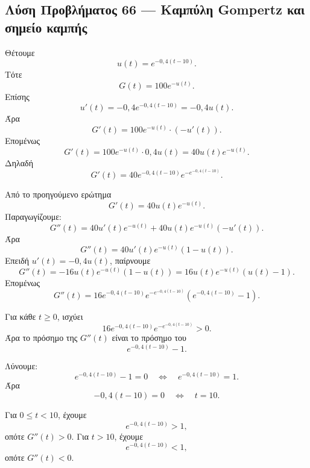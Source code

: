 \subsection*{Λύση Προβλήματος 66 --- Καμπύλη Gompertz και σημείο καμπής}

\begin{alist}
  \item Θέτουμε
        \[
          u(t)=e^{-0{,}4(t-10)}.
        \]
        Τότε
        \[
          G(t)=100e^{-u(t)}.
        \]
        Επίσης
        \[
          u'(t)=-0{,}4e^{-0{,}4(t-10)}=-0{,}4u(t).
        \]
        Άρα
        \[
          G'(t)
          =
          100e^{-u(t)}\cdot(-u'(t)).
        \]
        Επομένως
        \[
          G'(t)
          =
          100e^{-u(t)}\cdot0{,}4u(t)
          =
          40u(t)e^{-u(t)}.
        \]
        Δηλαδή
        \[
          {
          G'(t)=40e^{-0{,}4(t-10)}e^{-e^{-0{,}4(t-10)}}
          }.
        \]

  \item Από το προηγούμενο ερώτημα
        \[
          G'(t)=40u(t)e^{-u(t)}.
        \]
        Παραγωγίζουμε:
        \[
          G''(t)
          =
          40u'(t)e^{-u(t)}+40u(t)e^{-u(t)}(-u'(t)).
        \]
        Άρα
        \[
          G''(t)
          =
          40u'(t)e^{-u(t)}(1-u(t)).
        \]
        Επειδή \(u'(t)=-0{,}4u(t)\), παίρνουμε
        \[
          G''(t)
          =
          -16u(t)e^{-u(t)}(1-u(t))
          =
          16u(t)e^{-u(t)}(u(t)-1).
        \]
        Επομένως
        \[
          {
          G''(t)=16e^{-0{,}4(t-10)}e^{-e^{-0{,}4(t-10)}}
          \left(e^{-0{,}4(t-10)}-1\right)
          }.
        \]

  \item Για κάθε \(t\geq0\), ισχύει
        \[
          16e^{-0{,}4(t-10)}e^{-e^{-0{,}4(t-10)}}>0.
        \]
        Άρα το πρόσημο της \(G''(t)\) είναι το πρόσημο του
        \[
          e^{-0{,}4(t-10)}-1.
        \]

        Λύνουμε:
        \[
          e^{-0{,}4(t-10)}-1=0
          \quad\Longleftrightarrow\quad
          e^{-0{,}4(t-10)}=1.
        \]
        Άρα
        \[
          -0{,}4(t-10)=0
          \quad\Longleftrightarrow\quad
          t=10.
        \]

        Για \(0\leq t<10\), έχουμε
        \[
          e^{-0{,}4(t-10)}>1,
        \]
        οπότε \(G''(t)>0\). Για \(t>10\), έχουμε
        \[
          e^{-0{,}4(t-10)}<1,
        \]
        οπότε \(G''(t)<0\).


\end{alist}
